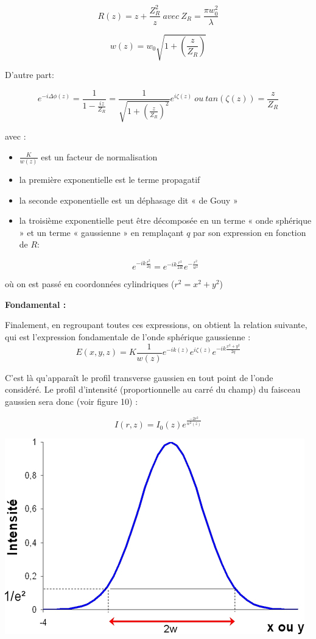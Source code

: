 \documentclass{book}
\begin{document}
$$R(z)=z+\frac{Z_R^2}{z}\ avec\ Z_R=\frac {\pi w_0^2} \lambda$$

$$w(z) = w_0\sqrt{1+\left(\frac z {Z_R}\right)}$$

D'autre part:

$$e^{-i\Delta \phi (z)}=\frac 1 {1-\frac {iz}{Z_R}}=\frac 1 {\sqrt{1+\left( \frac z
            {Z_R}\right)^2}}e^{i\zeta
            (z)} \ ou \ tan(\zeta (z))=\frac z {Z_R}$$

avec :
\begin{itemize}
 
    \item $\frac K {w(z)}$ est un facteur de normalisation
    \item la première exponentielle est le terme propagatif
    \item la seconde exponentielle est un déphasage dit « de Gouy »
    \item la troisième exponentielle peut être décomposée en un terme « onde sphérique » et un terme « gaussienne » en remplaçant $q$ par son expression en fonction de $R$:
    
    $$e^{-ik\frac {r^2}{2q}} = e^{-ik \frac {r^2}{2R}}e^{-\frac {r^2}{w^2}}$$
    
\end{itemize}

où on est passé en coordonnées cylindriques ($r^2=x^2 + y^2$)


\textbf{\color{fondamental1}Fondamental :}  
\begin{mdframed}[linecolor=fondamental1, backgroundcolor=fondamental2]

Finalement, en regroupant toutes ces expressions, on obtient la relation suivante, qui est l'expression fondamentale de l'onde sphérique gaussienne :
$$E(x, y, z)=K \frac 1 {w(z)} e^{-ik(z)} e^{i\zeta(z)} e^{-ik \frac {x^2+y^2}{2q} }$$

\end{mdframed}

C'est là qu'apparaît le profil transverse gaussien en tout point de l'onde considéré. Le profil d'intensité (proportionnelle au carré du champ) du faisceau gaussien sera donc (voir figure 10) :

$$I(r, z) = I_0(z)e^{\frac {-2r^2}{w^2(z)}}$$

{\centering
\includegraphics[scale=1.7]{images/fig10.jpg}
\par}
\end{document}

